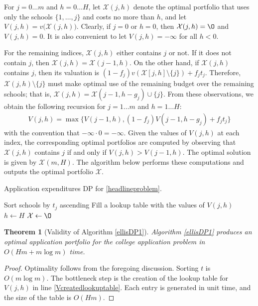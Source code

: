 \documentclass[11pt]{article} %
\newtheorem{theorem}{Theorem}
\theoremstyle{definition}
\begin{document}
For $j = 0 \dots m$ and $h = 0 \dots H$, let $\mathcal{X}(j, h)$ denote the optimal portfolio that uses only the schools $\{ 1, \dots, j\}$ and costs no more than $h$, and let $V(j,h) = v\bigl(\mathcal{X}(j, h)\bigr)$. Clearly, if $j=0$ or $h=0$, then $\mathcal{X}(j, h) = \O$ and $V(j, h) = 0$. It is also convenient to let $V(j, h) = -\infty$ for all $h < 0$.

For the remaining indices, $\mathcal{X}(j, h)$ either contains $j$ or not. If it does not contain $j$, then $\mathcal{X}(j, h) = \mathcal{X}(j-1, h)$. On the other hand, if  $\mathcal{X}(j, h)$ contains $j$, then its valuation is $(1 - f_j) v(\mathcal{X}[j, h]\setminus \{j\}) + f_j t_j$. Therefore, $\mathcal{X}(j, h)\setminus \{j\}$ must make optimal use of the remaining budget over the remaining schools; that is, $\mathcal{X}(j, h) = \mathcal{X}(j-1, h - g_j) \cup\{j\}$. From these observations, we obtain the following recursion for $ j = 1\dots m$ and $h = 1\dots H$:
\begin{align}
V(j, h) = \max\bigl\{ V(j-1, h), (1 - f_j) V(j-1, h-g_j) + f_j t_j \bigr\}
\end{align}
with the convention that $ -\infty \cdot 0 = -\infty$. Given the values of $V(j, h)$ at each index, the corresponding optimal portfolios are computed by observing that $\mathcal{X}(j, h)$ contains $j$ if and only if $V(j, h) > V(j-1, h)$. The optimal solution is given by $\mathcal{X}(m, H)$. The algorithm below performs these computations and outputs the optimal portfolio $\mathcal{X}$. 

\begin{algorithm}[h] 
\caption{Application expenditures DP for \eqref{headlineproblem}.} \label{ellisDP1}
Sort schools by $t_j$ ascending\;
Fill a lookup table with the values of $V(j, h)$\; \label{Vcreatedlookuptable}
$h \gets H$\;
$\mathcal{X} \gets \O$\;
\;
\end{algorithm}

\begin{theorem}[Validity of Algorithm \ref{ellisDP1}]
Algorithm \ref{ellisDP1} produces an optimal application portfolio for the college application problem in $O(H m + m \log m)$ time.
\end{theorem}

\begin{proof}
Optimality follows from the foregoing discussion. Sorting $t$ is $O(m \log m)$. The bottleneck step is the creation of the lookup table for $V(j, h)$ in line \ref{Vcreatedlookuptable}. Each entry is generated in unit time, and the size of the table is $O(Hm)$.
\end{proof}
\end{document}
